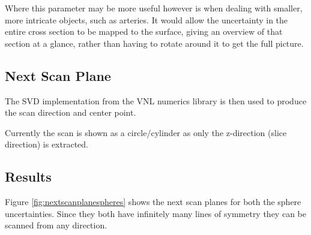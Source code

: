 Where this parameter may be more useful however is when dealing with smaller, more intricate objects, such as arteries. It would allow the uncertainty in the entire cross section to be mapped to the surface, giving an overview of that section at a glance, rather than having to rotate around it to get the full picture.

\clearpage
\subsection{Next Scan Plane}

The SVD implementation from the VNL numerics library is then used to produce the scan direction and center point. 

Currently the scan is shown as a circle/cylinder as only the z-direction (slice direction) is extracted.

\subsection*{Results}
Figure \ref{fig:nextscanplanespheres} shows the next scan planes for both the sphere uncertainties. Since they both have infinitely many lines of symmetry they can be scanned from any direction.

